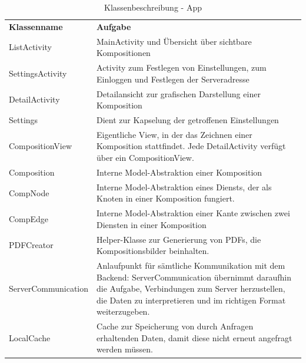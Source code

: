 \begin{table}[h]
	\centering
	\begin{tabularx}{\textwidth}{X X}
		\rowcolor[HTML]{C0C0C0} 
		\textbf{Klassenname} & \textbf{Aufgabe} \\
		ListActivity & MainActivity und Übersicht über sichtbare Kompositionen  \\
		\rowcolor[HTML]{E7E7E7} 
		SettingsActivity & Activity zum Festlegen von Einstellungen, zum Einloggen und Festlegen der Serveradresse \\
		DetailActivity & Detailansicht zur grafischen Darstellung einer Komposition \\
		\rowcolor[HTML]{E7E7E7} 
		Settings & Dient zur Kapselung der getroffenen Einstellungen \\
		CompositionView & Eigentliche View, in der das Zeichnen einer Komposition stattfindet. Jede DetailActivity verfügt über ein CompositionView. \\
		\rowcolor[HTML]{E7E7E7} 
		Composition & Interne Model-Abstraktion einer Komposition \\
		CompNode & Interne Model-Abstraktion eines Diensts, der als Knoten in einer Komposition fungiert. \\
		\rowcolor[HTML]{E7E7E7} 
		CompEdge & Interne Model-Abstraktion einer Kante zwischen zwei Diensten in einer Komposition \\
		PDFCreator & Helper-Klasse zur Generierung von PDFs, die Kompositionsbilder beinhalten. \\
			\rowcolor[HTML]{E7E7E7} 
		ServerCommunication & Anlaufpunkt für sämtliche Kommunikation mit dem Backend: ServerCommunication übernimmt daraufhin die Aufgabe, Verbindungen zum Server herzustellen, die Daten zu interpretieren und im richtigen Format weiterzugeben. \\
		LocalCache & Cache zur Speicherung von durch Anfragen erhaltenden Daten, damit diese nicht erneut angefragt werden müssen. 
	\end{tabularx}
	\caption{Klassenbeschreibung - App}
	\label{table:klassenbeschreibung-a}
\end{table}